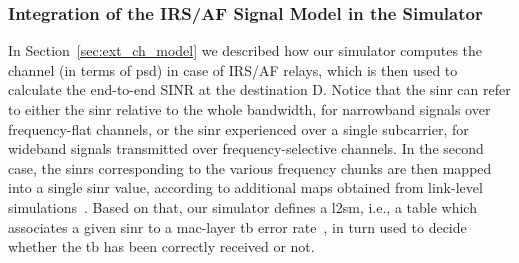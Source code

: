 \subsubsection{Integration of the IRS/AF Signal Model in the Simulator}
In Section~\ref{sec:ext_ch_model} we described how our simulator computes the channel (in terms of \gls{psd}) in case of IRS/AF relays, which is then used to calculate the end-to-end SINR at the destination D. 
Notice that the \gls{sinr} can refer to either the \gls{sinr} relative to the whole bandwidth, for narrowband signals over frequency-flat channels, or the \gls{sinr} experienced over a single subcarrier, for wideband signals transmitted over frequency-selective channels. 
In the second case, the \glspl{sinr} corresponding to the various frequency chunks are then mapped into a single \gls{sinr} value, according to additional maps obtained from link-level simulations~\cite{lagen2020new}.
Based on that, our simulator defines a \gls{l2sm}, i.e., a table which associates a given \gls{sinr} to a \gls{mac}-layer \gls{tb} error rate~\cite{mezzavilla2012lightweight}, in turn used to decide whether the \gls{tb} has been correctly received or not.


